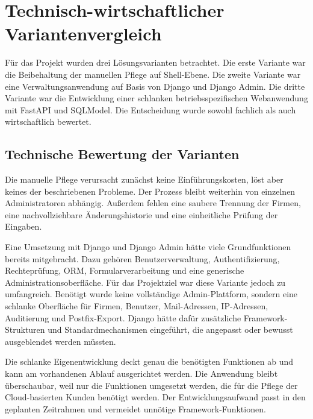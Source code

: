 \section{Technisch-wirtschaftlicher Variantenvergleich}
\label{sec:Variantenvergleich}
Für das Projekt wurden drei Lösungsvarianten betrachtet. Die erste
Variante war die Beibehaltung der manuellen Pflege auf Shell-Ebene. Die zweite
Variante war eine Verwaltungsanwendung auf Basis von Django und Django Admin.
Die dritte Variante war die Entwicklung einer schlanken betriebsspezifischen
Webanwendung mit FastAPI und SQLModel. Die Entscheidung wurde sowohl fachlich
als auch wirtschaftlich bewertet.

\subsection{Technische Bewertung der Varianten}
\label{sec:TechnischeBewertung}
Die manuelle Pflege verursacht zunächst keine Einführungskosten, löst aber
keines der beschriebenen Probleme. Der Prozess bleibt weiterhin von einzelnen
Administratoren abhängig. Außerdem fehlen eine saubere Trennung der
Firmen, eine nachvollziehbare Änderungshistorie und eine einheitliche
Prüfung der Eingaben.

Eine Umsetzung mit Django und Django Admin hätte viele Grundfunktionen bereits
mitgebracht. Dazu gehören Benutzerverwaltung, Authentifizierung, Rechteprüfung,
ORM, Formularverarbeitung und eine generische Administrationsoberfläche. Für
das Projektziel war diese Variante jedoch zu umfangreich. Benötigt wurde keine
vollständige Admin-Plattform, sondern eine schlanke Oberfläche für Firmen,
Benutzer, Mail-Adressen, IP-Adressen, Auditierung und Postfix-Export. Django
hätte dafür zusätzliche Framework-Strukturen und Standardmechanismen
eingeführt, die angepasst oder bewusst ausgeblendet werden müssten.

Die schlanke Eigenentwicklung deckt genau die benötigten Funktionen ab und kann
am vorhandenen Ablauf ausgerichtet werden. Die Anwendung bleibt überschaubar,
weil nur die Funktionen umgesetzt werden, die für die Pflege der Cloud-basierten
Kunden benötigt werden. Der Entwicklungsaufwand passt in den geplanten
Zeitrahmen und vermeidet unnötige Framework-Funktionen.


